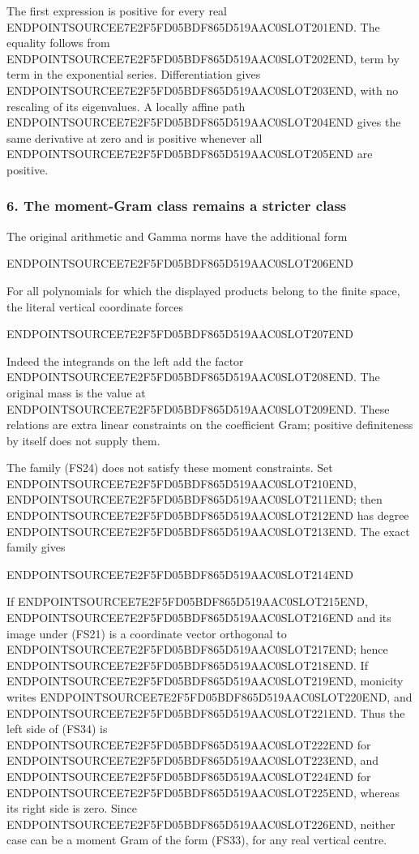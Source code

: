 The first expression is positive for every real ENDPOINTSOURCEE7E2F5FD05BDF865D519AAC0SLOT201END. The equality follows from ENDPOINTSOURCEE7E2F5FD05BDF865D519AAC0SLOT202END, term by term in the exponential series. Differentiation gives ENDPOINTSOURCEE7E2F5FD05BDF865D519AAC0SLOT203END, with no rescaling of its eigenvalues. A locally affine path ENDPOINTSOURCEE7E2F5FD05BDF865D519AAC0SLOT204END gives the same derivative at zero and is positive whenever all ENDPOINTSOURCEE7E2F5FD05BDF865D519AAC0SLOT205END are positive.

\subsubsection{6. The moment-Gram class remains a stricter class}\label{endpoint-four_window_sharpness--the-moment-gram-class-remains-a-stricter-class}

The original arithmetic and Gamma norms have the additional form

ENDPOINTSOURCEE7E2F5FD05BDF865D519AAC0SLOT206END

For all polynomials for which the displayed products belong to the finite space, the literal vertical coordinate forces

ENDPOINTSOURCEE7E2F5FD05BDF865D519AAC0SLOT207END

Indeed the integrands on the left add the factor ENDPOINTSOURCEE7E2F5FD05BDF865D519AAC0SLOT208END. The original mass is the value at ENDPOINTSOURCEE7E2F5FD05BDF865D519AAC0SLOT209END. These relations are extra linear constraints on the coefficient Gram; positive definiteness by itself does not supply them.

The family (FS24) does not satisfy these moment constraints. Set ENDPOINTSOURCEE7E2F5FD05BDF865D519AAC0SLOT210END, ENDPOINTSOURCEE7E2F5FD05BDF865D519AAC0SLOT211END; then ENDPOINTSOURCEE7E2F5FD05BDF865D519AAC0SLOT212END has degree ENDPOINTSOURCEE7E2F5FD05BDF865D519AAC0SLOT213END. The exact family gives

ENDPOINTSOURCEE7E2F5FD05BDF865D519AAC0SLOT214END

If ENDPOINTSOURCEE7E2F5FD05BDF865D519AAC0SLOT215END, ENDPOINTSOURCEE7E2F5FD05BDF865D519AAC0SLOT216END and its image under (FS21) is a coordinate vector orthogonal to ENDPOINTSOURCEE7E2F5FD05BDF865D519AAC0SLOT217END; hence ENDPOINTSOURCEE7E2F5FD05BDF865D519AAC0SLOT218END. If ENDPOINTSOURCEE7E2F5FD05BDF865D519AAC0SLOT219END, monicity writes ENDPOINTSOURCEE7E2F5FD05BDF865D519AAC0SLOT220END, and ENDPOINTSOURCEE7E2F5FD05BDF865D519AAC0SLOT221END. Thus the left side of (FS34) is ENDPOINTSOURCEE7E2F5FD05BDF865D519AAC0SLOT222END for ENDPOINTSOURCEE7E2F5FD05BDF865D519AAC0SLOT223END, and ENDPOINTSOURCEE7E2F5FD05BDF865D519AAC0SLOT224END for ENDPOINTSOURCEE7E2F5FD05BDF865D519AAC0SLOT225END, whereas its right side is zero. Since ENDPOINTSOURCEE7E2F5FD05BDF865D519AAC0SLOT226END, neither case can be a moment Gram of the form (FS33), for any real vertical centre.


